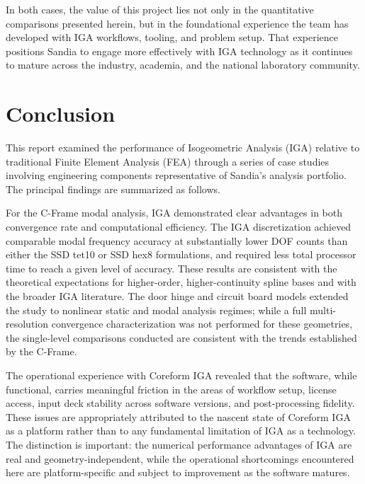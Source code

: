 \documentclass[12pt,report,justified]{SANDreport}
\begin{document}
In both cases, the value of this project lies not only in the quantitative comparisons
presented herein, but in the foundational experience the team has developed with IGA
workflows, tooling, and problem setup.  That experience positions Sandia to engage more
effectively with IGA technology as it continues to mature across the industry, academia,
and the national laboratory community.





\chapter{Conclusion}

This report examined the performance of Isogeometric Analysis (IGA) relative to
traditional Finite Element Analysis (FEA) through a series of case studies involving
engineering components representative of Sandia's analysis portfolio.  The principal
findings are summarized as follows.

For the C-Frame modal analysis, IGA demonstrated clear advantages in both convergence
rate and computational efficiency.  The IGA discretization achieved comparable modal
frequency accuracy at substantially lower DOF counts than either the SSD tet10 or SSD
hex8 formulations, and required less total processor time to reach a given level of
accuracy.  These results are consistent with the theoretical expectations for
higher-order, higher-continuity spline bases and with the broader IGA literature.  The
door hinge and circuit board models extended the study to nonlinear static and modal
analysis regimes; while a full multi-resolution convergence characterization was not
performed for these geometries, the single-level comparisons conducted are consistent
with the trends established by the C-Frame.

The operational experience with Coreform IGA revealed that the software, while
functional, carries meaningful friction in the areas of workflow setup, license access,
input deck stability across software versions, and post-processing fidelity.  These
issues are appropriately attributed to the nascent state of Coreform IGA as a platform
rather than to any fundamental limitation of IGA as a technology.  The distinction is
important: the numerical performance advantages of IGA are real and geometry-independent,
while the operational shortcomings encountered here are platform-specific and subject to
improvement as the software matures.
\end{document}
